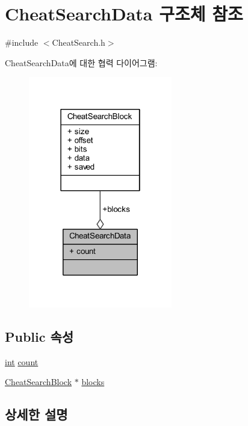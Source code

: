 \hypertarget{struct_cheat_search_data}{}\section{Cheat\+Search\+Data 구조체 참조}
\label{struct_cheat_search_data}


{\ttfamily \#include $<$Cheat\+Search.\+h$>$}



Cheat\+Search\+Data에 대한 협력 다이어그램\+:\nopagebreak
\begin{figure}[H]
\begin{center}
\leavevmode
\includegraphics[width=178pt]{struct_cheat_search_data__coll__graph}
\end{center}
\end{figure}
\subsection*{Public 속성}
\begin{DoxyCompactItemize}
\item 
\mbox{\hyperlink{_util_8cpp_a0ef32aa8672df19503a49fab2d0c8071}{int}} \mbox{\hyperlink{struct_cheat_search_data_a4c4d3092ddaff068d820c28067b15774}{count}}
\item 
\mbox{\hyperlink{struct_cheat_search_block}{Cheat\+Search\+Block}} $\ast$ \mbox{\hyperlink{struct_cheat_search_data_ae0235bdc2000cc25b8c072442ce33c2c}{blocks}}
\end{DoxyCompactItemize}


\subsection{상세한 설명}


